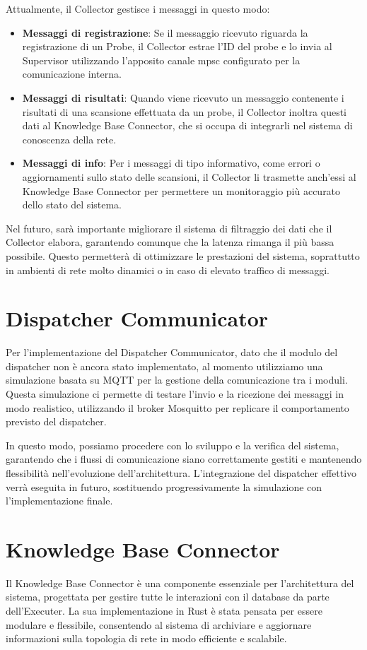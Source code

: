 \documentclass[target=bach,aauheader=,style=]{thud}
\begin{document}
Attualmente, il Collector gestisce i messaggi in questo modo:
\begin{itemize}
  \item \textbf{Messaggi di registrazione}: Se il messaggio ricevuto riguarda la registrazione di un Probe, il Collector estrae l'ID del probe e lo invia al Supervisor utilizzando l'apposito canale mpsc configurato per la comunicazione interna.

  \item \textbf{Messaggi di risultati}: Quando viene ricevuto un messaggio contenente i risultati di una scansione effettuata da un probe, il Collector inoltra questi dati al Knowledge Base Connector, che si occupa di integrarli nel sistema di conoscenza della rete.

  \item \textbf{Messaggi di info}: Per i messaggi di tipo informativo, come errori o aggiornamenti sullo stato delle scansioni, il Collector li trasmette anch'essi al Knowledge Base Connector per permettere un monitoraggio più accurato dello stato del sistema.
\end{itemize}

Nel futuro, sarà importante migliorare il sistema di filtraggio dei dati che il Collector elabora, garantendo comunque che la latenza rimanga il più bassa possibile. Questo permetterà di ottimizzare le prestazioni del sistema, soprattutto in ambienti di rete molto dinamici o in caso di elevato traffico di messaggi.

\section{Dispatcher Communicator}
Per l'implementazione del Dispatcher Communicator, dato che il modulo del dispatcher non è ancora stato implementato, al momento utilizziamo una simulazione basata su MQTT per la gestione della comunicazione tra i moduli. Questa simulazione ci permette di testare l'invio e la ricezione dei messaggi in modo realistico, utilizzando il broker Mosquitto per replicare il comportamento previsto del dispatcher.

In questo modo, possiamo procedere con lo sviluppo e la verifica del sistema, garantendo che i flussi di comunicazione siano correttamente gestiti e mantenendo flessibilità nell'evoluzione dell'architettura. L'integrazione del dispatcher effettivo verrà eseguita in futuro, sostituendo progressivamente la simulazione con l'implementazione finale.

\section{Knowledge Base Connector}
Il Knowledge Base Connector è una componente essenziale per l'architettura del sistema, progettata per gestire tutte le interazioni con il database da parte dell'Executer. La sua implementazione in Rust è stata pensata per essere modulare e flessibile, consentendo al sistema di archiviare e aggiornare informazioni sulla topologia di rete in modo efficiente e scalabile.
\end{document}
